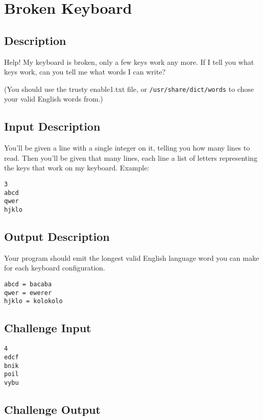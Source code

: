 \section{Broken Keyboard}

\subsection*{Description}\label{description-2}

Help! My keyboard is broken, only a few keys work any more. If I tell
you what keys work, can you tell me what words I can write?

(You should use the trusty enable1.txt file, or
\texttt{/usr/share/dict/words} to chose your valid English words from.)

\subsection*{Input Description}\label{input-description-1}

You'll be given a line with a single integer on it, telling you how many
lines to read. Then you'll be given that many lines, each line a list of
letters representing the keys that work on my keyboard. Example:

\begin{lstlisting}
3
abcd
qwer
hjklo
\end{lstlisting}

\subsection*{Output Description}\label{output-description-1}

Your program should emit the longest valid English language word you can
make for each keyboard configuration.

\begin{lstlisting}
abcd = bacaba
qwer = ewerer
hjklo = kolokolo
\end{lstlisting}

\subsection*{Challenge Input}\label{challenge-input-2}

\begin{lstlisting}
4
edcf
bnik
poil
vybu
\end{lstlisting}

\subsection*{Challenge Output}\label{challenge-output-1}

